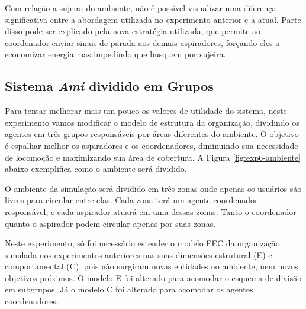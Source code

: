 Com relação a sujeira do ambiente, não é possível visualizar uma diferença significativa entre a abordagem utilizada no experimento anterior e a atual. Parte disso pode ser explicado pela nova estratégia utilizada, que permite ao coordenador enviar sinais de parada aos demais aspiradores, forçando eles a economizar energia mas impedindo que busquem por sujeira.


\subsection{Sistema \textit{Ami} dividido em Grupos}
\label{sec:grupo}

Para tentar melhorar mais um pouco os valores de utilidade do sistema, neste experimento vamos modificar o modelo de estrutura da organização, dividindo os agentes em três grupos responsáveis por áreas diferentes do ambiente. O objetivo é espalhar melhor os aspiradores e os coordenadores, diminuindo sua necessidade de locomoção e maximizando sua área de cobertura. A Figura \ref{fig:exp6-ambiente} abaixo exemplifica como o ambiente será dividido. 

\begin{figure}[h!]
    \centering
\end{figure}

O ambiente da simulação será dividido em três zonas onde apenas os usuários são livres para circular entre elas. Cada zona terá um agente coordenador responsável, e cada aspirador atuará em uma dessas zonas. Tanto o coordenador quanto o aspirador podem circular apenas por suas zonas. 

Neste experimento, só foi necessário estender o modelo FEC da organização simulada nos experimentos anteriores nas suas dimensões estrutural (E) e comportamental (C), pois não surgiram novas entidades no ambiente, nem novos objetivos próximos. O modelo E foi alterado para acomodar o esquema de divisão em subgrupos. Já o modelo C foi alterado para acomodar os agentes coordenadores.

